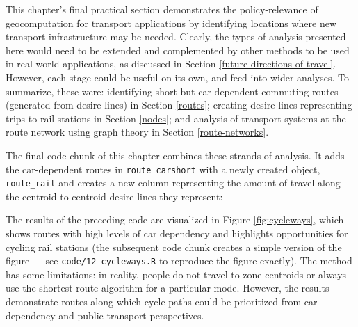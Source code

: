 \documentclass[]{krantz}
\newenvironment{Shaded}{\begin{snugshade}}{\end{snugshade}}
\newcommand{\DataTypeTok}[1]{\textcolor[rgb]{0.27,0.27,0.27}{#1}}
\newcommand{\DecValTok}[1]{\textcolor[rgb]{0.06,0.06,0.06}{#1}}
\newcommand{\KeywordTok}[1]{\textcolor[rgb]{0.27,0.27,0.27}{\textbf{#1}}}
\newcommand{\NormalTok}[1]{#1}
\newcommand{\OperatorTok}[1]{\textcolor[rgb]{0.43,0.43,0.43}{\textbf{#1}}}
\newcommand{\StringTok}[1]{\textcolor[rgb]{0.5,0.5,0.5}{#1}}
\begin{document}
This chapter's final practical section demonstrates the policy-relevance of geocomputation for transport applications by identifying locations where new transport infrastructure may be needed.
Clearly, the types of analysis presented here would need to be extended and complemented by other methods to be used in real-world applications, as discussed in Section \ref{future-directions-of-travel}.
However, each stage could be useful on its own, and feed into wider analyses.
To summarize, these were: identifying short but car-dependent commuting routes (generated from desire lines) in Section \ref{routes}; creating desire lines representing trips to rail stations in Section \ref{nodes}; and analysis of transport systems at the route network using graph theory in Section \ref{route-networks}.

The final code chunk of this chapter combines these strands of analysis.
It adds the car-dependent routes in \texttt{route\_carshort} with a newly created object, \texttt{route\_rail} and creates a new column representing the amount of travel along the centroid-to-centroid desire lines they represent:

\begin{Shaded}
\end{Shaded}

\begin{Shaded}
\end{Shaded}

The results of the preceding code are visualized in Figure \ref{fig:cycleways}, which shows routes with high levels of car dependency and highlights opportunities for cycling rail stations (the subsequent code chunk creates a simple version of the figure --- see \texttt{code/12-cycleways.R} to reproduce the figure exactly).
The method has some limitations: in reality, people do not travel to zone centroids or always use the shortest route algorithm for a particular mode.
However, the results demonstrate routes along which cycle paths could be prioritized from car dependency and public transport perspectives.
\end{document}
